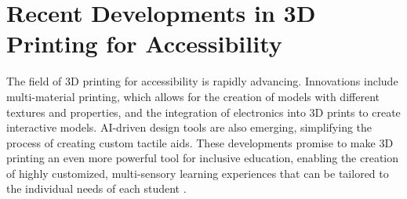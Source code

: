 \section{Recent Developments in 3D Printing for Accessibility}\label{ch5:sec:developments}
The field of 3D printing for accessibility is rapidly advancing. Innovations include multi-material printing, which allows for the creation of models with different textures and properties, and the integration of electronics into 3D prints to create interactive models. AI-driven design tools are also emerging, simplifying the process of creating custom tactile aids. These developments promise to make 3D printing an even more powerful tool for inclusive education, enabling the creation of highly customized, multi-sensory learning experiences that can be tailored to the individual needs of each student \supercite{Jo2016}.
